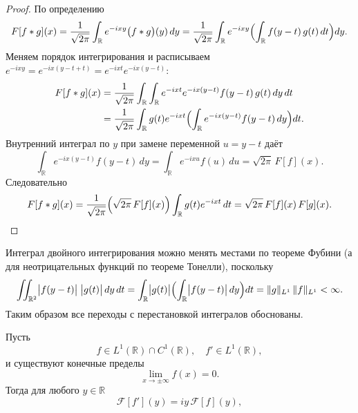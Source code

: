 \begin{proof}
    По определению
    \[
        F[f*g](x)
        =\frac1{\sqrt{2\pi}}\int_{\mathbb R}e^{-i x y}\bigl(f*g\bigr)(y)\,dy
        =\frac1{\sqrt{2\pi}}\int_{\mathbb R}e^{-i x y}
        \Bigl(\int_{\mathbb R}f(y-t)\,g(t)\,dt\Bigr)dy.
    \]
    Меняем порядок интегрирования и расписываем
    $e^{-i x y}=e^{-i x (y-t+t)}=e^{-i x t}e^{-i x (y-t)}$:
    \begin{align*}
        F[f*g](x)
        &=\frac1{\sqrt{2\pi}}
        \int_{\mathbb R}\int_{\mathbb R}e^{-i x t}e^{-i x (y-t)}f(y-t)\,g(t)\,dy\,dt\\
        &=\frac1{\sqrt{2\pi}}
        \int_{\mathbb R}g(t)e^{-i x t}
        \Bigl(\int_{\mathbb R}e^{-i x (y-t)}f(y-t)\,dy\Bigr)dt.
    \end{align*}
    Внутренний интеграл по $y$ при замене переменной $u=y-t$ даёт
    \[
        \int_{\mathbb R}e^{-i x (y-t)}f(y-t)\,dy
        =\int_{\mathbb R}e^{-i x u}f(u)\,du
        =\sqrt{2\pi}\, F[f](x).
    \]
    Следовательно
    \[
        F[f*g](x)
        =\frac1{\sqrt{2\pi}}\Bigl(\sqrt{2\pi}\, F[f](x)\Bigr)
        \int_{\mathbb R}g(t)e^{-i x t}\,dt
        =\sqrt{2\pi}\, F[f](x)\, F[g](x).
    \]
\end{proof}
\begin{note}
    Интеграл двойного интегрирования можно менять местами по теореме Фубини (а для неотрицательных функций по теореме Тонелли), поскольку
    \[
        \iint_{\mathbb R^2}\bigl|f(y-t)\bigr|\;\bigl|g(t)\bigr|\,dy\,dt
        =\int_{\mathbb R}\bigl|g(t)\bigr|\Bigl(\int_{\mathbb R}\bigl|f(y-t)\bigr|\,dy\Bigr)dt
        =\|g\|_{L^1}\,\|f\|_{L^1}<\infty.
    \]
    Таким образом все переходы с перестановкой интегралов обоснованы.
\end{note}



\begin{theorem}
    Пусть
    \[
        f\in L^1(\mathbb R)\cap C^1(\mathbb R),
        \quad f'\in L^1(\mathbb R),
    \]
    и существуют конечные пределы
    \[
        \lim_{x\to\pm\infty}f(x)=0.
    \]
    Тогда для любого $y\in\mathbb R$
    \[
        \mathcal F[f'](y)
        = i y\,\mathcal F[f](y),
    \]

\end{theorem}

